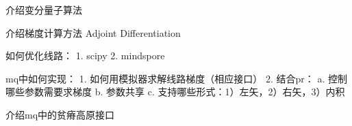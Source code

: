 介绍变分量子算法

介绍梯度计算方法 Adjoint Differentiation

如何优化线路：
1. scipy
2. mindspore

mq中如何实现：
1. 如何用模拟器求解线路梯度（相应接口）
2. 结合pr：
  a. 控制哪些参数需要求梯度
  b. 参数共享
  c. 支持哪些形式：1）左矢，2）右矢，3）内积

介绍mq中的贫瘠高原接口